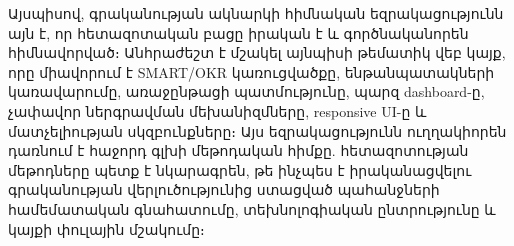 Այսպիսով, գրականության ակնարկի հիմնական եզրակացությունն այն է, որ հետազոտական բացը իրական է և գործնականորեն հիմնավորված։ Անհրաժեշտ է մշակել այնպիսի թեմատիկ վեբ կայք, որը միավորում է SMART/OKR կառուցվածքը, ենթանպատակների կառավարումը, առաջընթացի պատմությունը, պարզ dashboard-ը, չափավոր ներգրավման մեխանիզմները, responsive UI-ը և մատչելիության սկզբունքները։ Այս եզրակացությունն ուղղակիորեն դառնում է հաջորդ գլխի մեթոդական հիմքը. հետազոտության մեթոդները պետք է նկարագրեն, թե ինչպես է իրականացվելու գրականության վերլուծությունից ստացված պահանջների համեմատական գնահատումը, տեխնոլոգիական ընտրությունը և կայքի փուլային մշակումը։

\fussy
